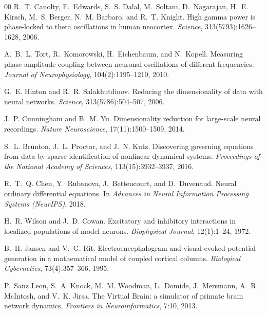 \documentclass[5p,twocolumn,authoryear]{elsarticle}
\begin{document}
\begin{thebibliography}{00}
R.~T. Canolty, E.~Edwards, S.~S. Dalal, M.~Soltani, D.~Nagarajan, H.~E. Kirsch, M.~S. Berger, N.~M. Barbaro, and R.~T. Knight.
\newblock High gamma power is phase-locked to theta oscillations in human neocortex.
\newblock \emph{Science}, 313(5793):1626--1628, 2006.

A.~B.~L. Tort, R.~Komorowski, H.~Eichenbaum, and N.~Kopell.
\newblock Measuring phase-amplitude coupling between neuronal oscillations of different frequencies.
\newblock \emph{Journal of Neurophysiology}, 104(2):1195--1210, 2010.

G.~E. Hinton and R.~R. Salakhutdinov.
\newblock Reducing the dimensionality of data with neural networks.
\newblock \emph{Science}, 313(5786):504--507, 2006.

J.~P. Cunningham and B.~M. Yu.
\newblock Dimensionality reduction for large-scale neural recordings.
\newblock \emph{Nature Neuroscience}, 17(11):1500--1509, 2014.

S.~L. Brunton, J.~L. Proctor, and J.~N. Kutz.
\newblock Discovering governing equations from data by sparse identification of nonlinear dynamical systems.
\newblock \emph{Proceedings of the National Academy of Sciences}, 113(15):3932--3937, 2016.

R.~T.~Q. Chen, Y.~Rubanova, J.~Bettencourt, and D.~Duvenaud.
\newblock Neural ordinary differential equations.
\newblock In \emph{Advances in Neural Information Processing Systems (NeurIPS)}, 2018.

H.~R. Wilson and J.~D. Cowan.
\newblock Excitatory and inhibitory interactions in localized populations of model neurons.
\newblock \emph{Biophysical Journal}, 12(1):1--24, 1972.

B.~H. Jansen and V.~G. Rit.
\newblock Electroencephalogram and visual evoked potential generation in a mathematical model of coupled cortical columns.
\newblock \emph{Biological Cybernetics}, 73(4):357--366, 1995.

P.~Sanz Leon, S.~A. Knock, M.~M. Woodman, L.~Domide, J.~Mersmann, A.~R. McIntosh, and V.~K. Jirsa.
\newblock The Virtual Brain: a simulator of primate brain network dynamics.
\newblock \emph{Frontiers in Neuroinformatics}, 7:10, 2013.


\end{thebibliography}
\end{document}
